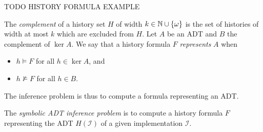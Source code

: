 \begin{example}

  TODO HISTORY FORMULA EXAMPLE

\end{example}

The \emph{complement} of a history set $H$ of width $k \in \mathbb{N} \cup
{\{{\omega}\}}$ is the set of histories of width at most $k$ which are excluded
from $H$. Let $A$ be an ADT and $B$ the complement of $\ker A$. We say that
a history formula $F$ \emph{represents} $A$ when
\begin{itemize}

  \item $h \models F$ for all $h \in \ker A$, and

  \item $h \not\models F$ for all $h \in B$.

\end{itemize}
The inference problem is thus to compute a formula representing an ADT.

\begin{definition}

  The \emph{symbolic ADT inference problem} is to compute a history formula $F$
  representing the ADT $H(\mathcal{I})$ of a given implementation $\mathcal{I}$.

\end{definition}
